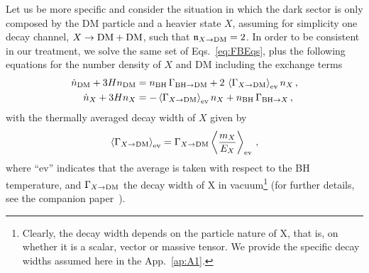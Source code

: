 \documentclass[aps,prd,reprint,twocolumn,preprintnumbers,floatfix,nofootinbib]{revtex4-1}
\newcommand{\bh}{{\rm BH}}
\begin{document}
Let us be more specific and consider the situation in which the dark sector is only composed by the DM particle and a heavier state $X$, assuming for simplicity one decay channel, $X\to {\rm DM + DM}$, such that $\mathfrak{n}_{X\to\rm DM} = 2$. In order to be consistent in our treatment, we solve the same set of Eqs.~\eqref{eq:FBEqs}, plus the following equations for the number density of $X$ and DM including the exchange terms
\begin{subequations}
\begin{align}
\dot{n}_{\rm DM} + 3H n_{\rm DM} &= n_\bh\, \Gamma_{\rm BH \to DM} + 2\, \left\langle\Gamma_{X\to {\rm DM}}\right\rangle_{\rm ev} n_X\,,\\
    \dot{n}_{X} + 3H n_{X} &= - \left\langle\Gamma_{X\to {\rm DM}}\right\rangle_{\rm ev} n_X + n_\bh\, \Gamma_{{\rm BH} \to X}\,,
\end{align}
\end{subequations}
with the thermally averaged decay width of $X$ given by
\begin{align}
    \left\langle\Gamma_{X\to {\rm DM}}\right\rangle_{\rm ev} = \Gamma_{X\to {\rm DM}}\left\langle \frac{m_X}{E_X}\right\rangle_{\rm ev}\,,
\end{align}
where ``\rm{ev}'' indicates that the average is taken with respect to the BH temperature, and $\Gamma_{X\to {\rm DM}}$ the decay width of X in vacuum\footnote{Clearly, the decay width depends on the particle nature of X, that is, on whether it is a scalar, vector or massive tensor. We provide the specific decay widths assumed here in the App.~\ref{ap:A1}.} (for further details, see the companion paper~\cite{paperB}).
\end{document}
